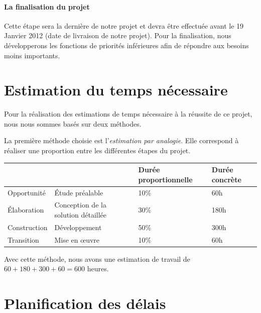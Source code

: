 \paragraph{La finalisation du projet}

Cette étape sera la dernière de notre projet et devra être effectuée avant le 19 Janvier 2012 (date de livraison de notre projet).
Pour la finalisation, nous développerons les fonctions de priorités inférieures afin de répondre aux besoins moins importants. 

\section{Estimation du temps nécessaire}
Pour la réalisation des estimations de temps nécessaire à la réussite de ce projet,
nous nous sommes basés sur deux méthodes. 

La première méthode choisie est l'\emph{estimation par analogie}.
Elle correspond à réaliser une proportion entre les différentes étapes du projet. 

\begin{tabular}{|l l|l|l|}
\hline
&& Durée proportionnelle & Durée concrète \\
\hline
Opportunité & Étude préalable & 10\% & 60h \\
\hline
Élaboration & Conception de la solution détaillée & 30\% & 180h \\
\hline
Construction & Développement & 50\% & 300h \\
\hline
Transition & Mise en œuvre & 10\% & 60h \\
\hline
\end{tabular}

Avec cette méthode, nous avons une estimation de travail de $60 + 180 + 300 + 60 = 600$ heures. 

\section{Planification des délais}

